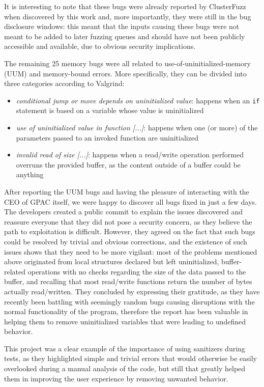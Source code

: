 It is interesting to note that these bugs were already reported by ClusterFuzz when discovered by this work and, more importantly, they were still in the bug disclosure windows: this meant that the inputs causing these bugs were not meant to be added to later fuzzing queues and should have not been publicly accessible and available, due to obvious security implications.

The remaining 25 memory bugs were all related to use-of-uninitialized-memory (UUM) and memory-bound errors. More specifically, they can be divided into three categories according to Valgrind:
\begin{itemize}
    \item \textit{conditional jump or move depends on uninitialized value}: happens when an \verb|if| statement is based on a variable whose value is uninitialized
    \item \textit{use of uninitialized value in function [...]}: happens when one (or more) of the parameters passed to an invoked function are uninitialized
    \item \textit{invalid read of size [...]}: happens when a read/write operation performed overruns the provided buffer, as the content outside of a buffer could be anything
\end{itemize}

After reporting the UUM bugs and having the pleasure of interacting with the CEO of GPAC itself, we were happy to discover all bugs fixed in just a few days. The developers created a public commit \cite{gpac_commit} to explain the issues discovered and reassure everyone that they did not pose a security concern, as they believe the path to exploitation is difficult. However, they agreed on the fact that such bugs could be resolved by trivial and obvious corrections, and the existence of such issues shows that they need to be more vigilant: most of the problems mentioned above originated from local structures declared but left uninitialized, buffer-related operations with no checks regarding the size of the data passed to the buffer, and recalling that most read/write functions return the number of bytes actually read/written.
They concluded by expressing their gratitude, as they have recently been battling with seemingly random bugs causing disruptions with the normal functionality of the program, therefore the report has been valuable in helping them to remove uninitialized variables that were leading to undefined behavior.

This project was a clear example of the importance of using sanitizers during tests, as they highlighted simple and trivial errors that would otherwise be easily overlooked during a manual analysis of the code, but still that greatly helped them in improving the user experience by removing unwanted behavior.









